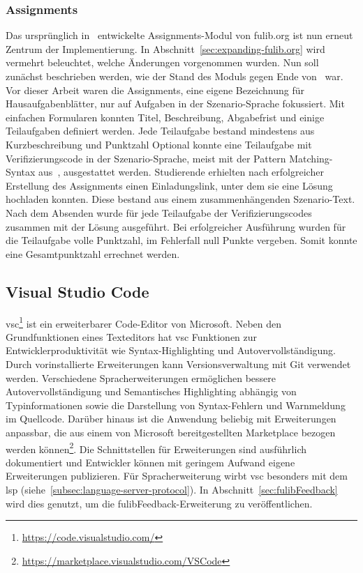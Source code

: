 \subsubsection{Assignments}
Das ursprünglich in~\cite{bachelor-thesis} entwickelte Assignments-Modul von fulib.org ist nun erneut Zentrum der Implementierung.
In Abschnitt~\ref{sec:expanding-fulib.org} wird vermehrt beleuchtet, welche Änderungen vorgenommen wurden.
Nun soll zunächst beschrieben werden, wie der Stand des Moduls gegen Ende von~\cite{bachelor-thesis} war.
Vor dieser Arbeit waren die Assignments, eine eigene Bezeichnung für Hausaufgabenblätter, nur auf Aufgaben in der Szenario-Sprache fokussiert.
Mit einfachen Formularen konnten Titel, Beschreibung, Abgabefrist und einige Teilaufgaben definiert werden.
Jede Teilaufgabe bestand mindestens aus Kurzbeschreibung und Punktzahl
Optional konnte eine Teilaufgabe mit Verifizierungscode in der Szenario-Sprache, meist mit der Pattern Matching-Syntax aus~\cite{bachelor-thesis}, ausgestattet werden.
Studierende erhielten nach erfolgreicher Erstellung des Assignments einen Einladungslink, unter dem sie eine Lösung hochladen konnten.
Diese bestand aus einem zusammenhängenden Szenario-Text.
Nach dem Absenden wurde für jede Teilaufgabe der Verifizierungscodes zusammen mit der Lösung ausgeführt.
Bei erfolgreicher Ausführung wurden für die Teilaufgabe volle Punktzahl, im Fehlerfall null Punkte vergeben.
Somit konnte eine Gesamtpunktzahl errechnet werden.

\subsection{Visual Studio Code}\label{subsec:visual-studio-code}

\ac{vsc}\footnote{\url{https://code.visualstudio.com/}} ist ein erweiterbarer Code-Editor von Microsoft.
Neben den Grundfunktionen eines Texteditors hat \ac{vsc} Funktionen zur Entwicklerproduktivität wie Syntax-Highlighting und Autovervollständigung.
Durch vorinstallierte Erweiterungen kann Versionsverwaltung mit Git verwendet werden.
Verschiedene Spracherweiterungen ermöglichen bessere Autovervollständigung und Semantisches Highlighting abhängig von Typinformationen sowie die Darstellung von Syntax-Fehlern und Warnmeldung im Quellcode.
Darüber hinaus ist die Anwendung beliebig mit Erweiterungen anpassbar, die aus einem von Microsoft bereitgestellten Marketplace bezogen werden können\footnote{\url{https://marketplace.visualstudio.com/VSCode}}.
Die Schnittstellen für Erweiterungen sind ausführlich dokumentiert und Entwickler können mit geringem Aufwand eigene Erweiterungen publizieren.
Für Spracherweiterung wirbt \ac{vsc} besonders mit dem \ac{lsp} (siehe~\ref{subsec:language-server-protocol}).
In Abschnitt~\ref{sec:fulibFeedback} wird dies genutzt, um die fulibFeedback-Erweiterung zu veröffentlichen.


